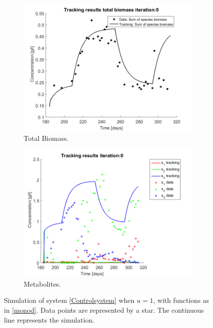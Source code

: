 \documentclass[3p,times]{article}
\begin{document}
\begin{figure}[h]
	\centering	
	\begin{subfigure}{0.45 \textwidth}
		\includegraphics[width=\textwidth]{Application//191218_Reactor_A_Biomass_iter_0}
		\caption{Total Biomass.}
		\label{biomass_no_control}
	\end{subfigure}
	\begin{subfigure}{0.45 \textwidth}
		\includegraphics[width= \textwidth]{Application//191218_Reactor_A_metabolites_Iter_0}
		\caption{Metabolites.}
		\label{u=1_metabolites}
	\end{subfigure}
		\caption{Simulation of system \eqref{Controlsystem} when $u=1$, with functions as in \eqref{monod}. Data points are represented by a star. The continuous line represents the simulation.}
		\label{u=1 simulation.}
\end{figure}
\end{document}
